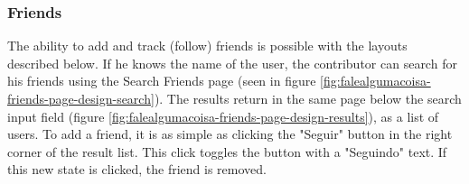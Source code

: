 \subsubsection{Friends}

The ability to add and track (follow) friends is possible with the layouts described below. If he knows the name of the user, the contributor can search for his friends using the Search Friends page (seen in figure \ref{fig:falealgumacoisa-friends-page-design-search}). The results return in the same page below the search input field (figure \ref{fig:falealgumacoisa-friends-page-design-results}), as a list of users. To add a friend, it is as simple as clicking the "Seguir" button in the right corner of the result list. This click toggles the button with a "Seguindo" text. If this new state is clicked, the friend is removed.

